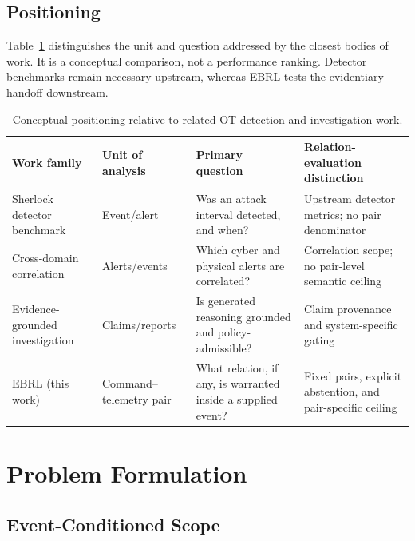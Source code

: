 \documentclass[conference]{IEEEtran}
\begin{document}
\subsection{Positioning}

Table~\ref{tab:positioning} distinguishes the unit and question addressed by the closest bodies of work. It is a conceptual comparison, not a performance ranking. Detector benchmarks remain necessary upstream, whereas EBRL tests the evidentiary handoff downstream.

\begin{table}[t]
\caption{Conceptual positioning relative to related OT detection and investigation work.}
\label{tab:positioning}
\centering\footnotesize
\begin{tabularx}{\textwidth}{@{}p{} p{} X p{}@{}}
\toprule
Work family & Unit of analysis & Primary question & Relation-evaluation distinction\\
\midrule
Sherlock detector benchmark \cite{wagner2025sherlock} & Event/alert & Was an attack interval detected, and when? & Upstream detector metrics; no pair denominator\\
Cross-domain correlation \cite{koucham2022crossdomain} & Alerts/events & Which cyber and physical alerts are correlated? & Correlation scope; no pair-level semantic ceiling\\
Evidence-grounded investigation \cite{zhou2026eviguard} & Claims/reports & Is generated reasoning grounded and policy-admissible? & Claim provenance and system-specific gating\\
EBRL (this work) & Command--telemetry pair & What relation, if any, is warranted inside a supplied event? & Fixed pairs, explicit abstention, and pair-specific ceiling\\
\bottomrule
\end{tabularx}
\end{table}

\section{Problem Formulation}

\subsection{Event-Conditioned Scope}
\end{document}
